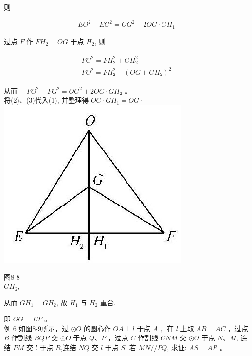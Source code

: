 \documentclass[10pt]{article}
\begin{document}
则

\begin{align*}
E O^{2}-E G^{2}=O G^{2}+2 O G \cdot G H_{1} \tag{2}
\end{align*}

过点 $F$ 作 $F H_{2} \perp O G$ 于点 $H_{2}$, 则

\begin{align*}
\begin{gather*}
F G^{2}=F H_{2}^{2}+G H_{2}^{2} \\
F O^{2}=F H_{2}^{2}+\left(O G+G H_{2}\right)^{2}
\end{gather*} \tag{3}
\end{align*}

从而 $\quad F O^{2}-F G^{2}=O G^{2}+2 O G \cdot G H_{2}$ 。\\
将(2)、(3)代入(1), 并整理得 $O G \cdot G H_{1}=O G \cdot$\\
\includegraphics[max width=\textwidth, center]{2024_10_30_66b8e5e701da2093c133g-060(1)}

图8-8\\
$G H_{2}$,

从而 $G H_{1}=G H_{2}$, 故 $H_{1}$ 与 $H_{2}$ 重合.

即 $O G \perp E F$ 。\\
例 6 如图8-9所示，过 $\odot O$ 的圆心作 $O A \perp l$ 于点 $A$ ，在 $l$ 上取 $A B=A C$ ，过点 $B$ 作割线 $B Q P$ 交 $\odot O$ 于点 $Q 、 P$ ，过点 $C$ 作割线 $C N M$ 交 $\odot O$ 于点 $N 、 M$, 连结 $P M$ 交 $l$ 于点 $R$,连结 $N Q$ 交 $l$ 于点 $S$, 若 $M N / / P Q$, 求证: $A S=A R$ 。
\end{document}
